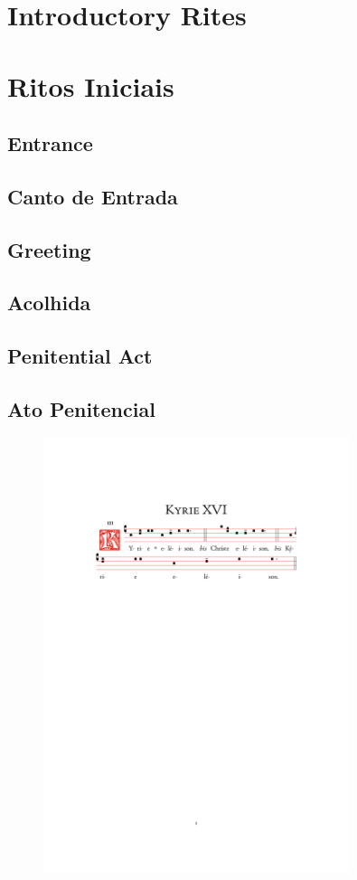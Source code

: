 \documentclass[10pt,a5]{article}
\newcommand \sect[2] {\section*{#1} \switchcolumn \section*{#2} \switchcolumn*}
\newcommand \subsect[2] {\subsection*{#1} \switchcolumn \subsection*{#2} \switchcolumn*}
\begin{document}
\massenglish




\begin{paracol}{2}

\sect{Introductory Rites}{Ritos Iniciais}

\subsect{Entrance}{Canto de Entrada}

\subsect{Greeting}{Acolhida}




\switchcolumn


\switchcolumn*

\subsect{Penitential Act}{Ato Penitencial}

\end{paracol}

\begin{figure}[h]
	\centering
	\includegraphics[trim = 35mm 200mm 35.5mm 45mm, clip, width = 0.8\textwidth]{scores/Kyrie-XVI.pdf}
\end{figure}
\end{document}
